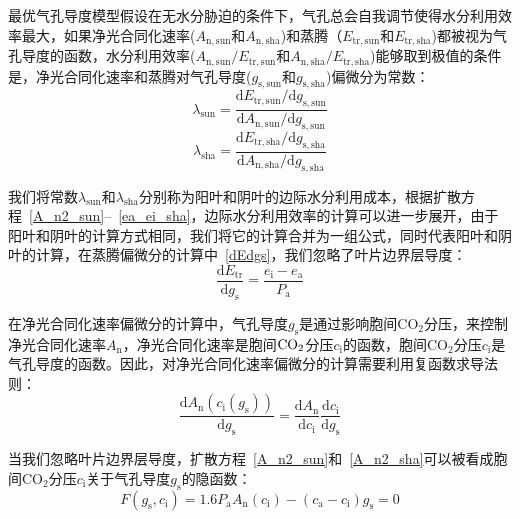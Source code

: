 最优气孔导度模型假设在无水分胁迫的条件下，气孔总会自我调节使得水分利用效率最大，如果净光合同化速率($ A_{\mathrm{n,sun}}$和$ A_{\mathrm{n,sha}}$)和蒸腾（$ E_{\mathrm{tr,sun}}$和$ E_{\mathrm{tr,sha}}$)都被视为气孔导度的函数，水分利用效率($ A_{\mathrm{n,sun}}/E_{\mathrm{tr,sun}}$和$ A_{\mathrm{n,sha}}/E_{\mathrm{tr,sha}}$)能够取到极值的条件是，净光合同化速率和蒸腾对气孔导度($ g_{\mathrm{s,sun}}$和$ g_{\mathrm{s,sha}}$)偏微分为常数：
\begin{equation}\label{lambda_sun}
\lambda_{\mathrm{sun}}=\frac{\mathrm{d} E_{\mathrm{tr,sun}}/\mathrm{d} g_{\mathrm{s,sun}}}{\mathrm{d} A_{\mathrm{n,sun}}/\mathrm{d} g_{\mathrm{s,sun}}}
\end{equation}
\begin{equation}\label{lambda_sha}
\lambda_{\mathrm{sha}}=\frac{\mathrm{d} E_{\mathrm{tr,sha}}/\mathrm{d} g_{\mathrm{s,sha}}}{\mathrm{d} A_{\mathrm{n,sha}}/\mathrm{d} g_{\mathrm{s,sha}}}
\end{equation}

我们将常数$\lambda_{\mathrm{sun}}$和$\lambda_{\mathrm{sha}}$分别称为阳叶和阴叶的边际水分利用成本，根据扩散方程~\eqref{A_n2_sun}--~\eqref{ea_ei_sha}，边际水分利用效率的计算可以进一步展开，由于阳叶和阴叶的计算方式相同，我们将它的计算合并为一组公式，同时代表阳叶和阴叶的计算，在蒸腾偏微分的计算中~\eqref{dEdgs}，我们忽略了叶片边界层导度：
\begin{equation}\label{dEdgs}
\frac{\mathrm{d} E_{\mathrm{tr}}}{\mathrm{d} g_{\mathrm{s}}}=\frac{e_{\mathrm{i}}-e_{\mathrm{a}}}{P_{\mathrm {a}}}
\end{equation}

在净光合同化速率偏微分的计算中，气孔导度$g_{\mathrm{s}}$是通过影响胞间$\mathrm {CO_2}$分压，来控制净光合同化速率$A_{\mathrm{n}}$，净光合同化速率是胞间$\rm CO_2$分压$c_{\mathrm{i}}$的函数，胞间$\mathrm {CO_2}$分压$c_{\mathrm{i}}$是气孔导度的函数。因此，对净光合同化速率偏微分的计算需要利用复函数求导法则：
\begin{equation}\label{dAdgs1}
\frac{\mathrm{d} A_{\mathrm{n}}\left(c_{\mathrm{i}}\left(g_{\mathrm{s}}\right)\right)}{\mathrm{d} g_{\mathrm{s}}}= \frac{\mathrm{d} A_{\mathrm{n}}}{\mathrm{d} c_{\mathrm{i}}}\frac{\mathrm{d} c_{\mathrm{i}}}{\mathrm{d} g_{\mathrm{s}}}
\end{equation}

当我们忽略叶片边界层导度，扩散方程~\eqref{A_n2_sun}和~\eqref{A_n2_sha}可以被看成胞间$\mathrm {CO_2}$分压$c_{\mathrm{i}}$关于气孔导度$g_{\mathrm{s}}$的隐函数：
\begin{equation}\label{cigsimplicit}
F\left(g_{\mathrm{s}},c_{\mathrm{i}}\right)=1.6P_{\mathrm {a}}A_{\mathrm{n}}\left(c_{\mathrm{i}}\right)-\left(c_{\mathrm{a}}-c_{\mathrm{i}}\right) g_{\mathrm{s}}=0
\end{equation}

